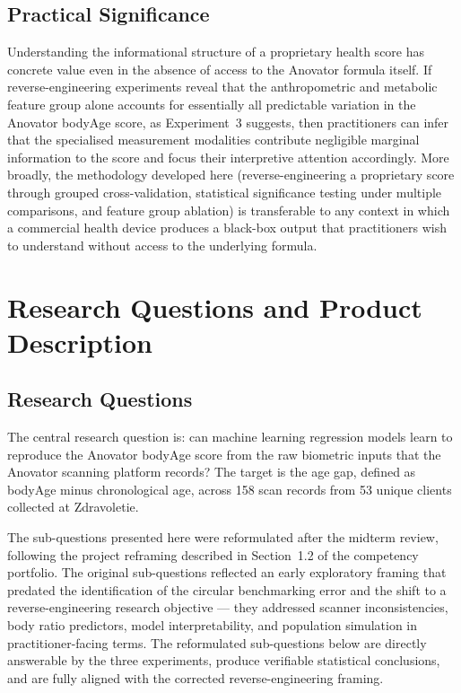 \documentclass[11pt,a4paper]{report}
\begin{document}
\section{Practical Significance}

Understanding the informational structure of a proprietary health score has concrete value even in
the absence of access to the Anovator formula itself. If reverse-engineering experiments reveal that the
anthropometric and metabolic feature group alone accounts for essentially all predictable variation
in the Anovator bodyAge score, as Experiment~3 suggests, then practitioners can infer that the
specialised measurement modalities contribute negligible marginal information to the score and focus
their interpretive attention accordingly. More broadly, the methodology developed here (reverse-engineering
a proprietary score through grouped cross-validation, statistical significance testing under multiple
comparisons, and feature group ablation) is transferable to any context in which a commercial health
device produces a black-box output that practitioners wish to understand without access to the
underlying formula.


\chapter{Research Questions and Product Description}
\label{chap:questions}

\section{Research Questions}

The central research question is: can machine learning regression models learn to reproduce the
Anovator bodyAge score from the raw biometric inputs that the Anovator scanning platform records?
The target is the age gap, defined as bodyAge minus chronological age, across 158 scan records from
53 unique clients collected at Zdravoletie.

The sub-questions presented here were reformulated after the midterm review, following the project reframing described in Section~1.2 of the competency portfolio. The original sub-questions reflected an early exploratory framing that predated the identification of the circular benchmarking error and the shift to a reverse-engineering research objective --- they addressed scanner inconsistencies, body ratio predictors, model interpretability, and population simulation in practitioner-facing terms. The reformulated sub-questions below are directly answerable by the three experiments, produce verifiable statistical conclusions, and are fully aligned with the corrected reverse-engineering framing.
\end{document}
